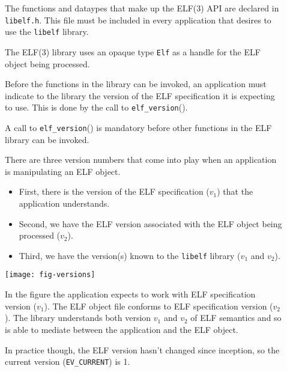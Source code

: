 \documentclass[a4paper]{report}
\makeatletter
\newcommand{\constant}[1]{\texttt{#1}}
\newcommand{\function}[1]{\texttt{#1}()}
\newcommand{\filename}[1]{\texttt{#1}}
\newcommand{\library}[1]{\texttt{#1}}
\newcommand{\type}[1]{\texttt{#1}}
\newenvironment{callout}[2][blue]{%
  \begingroup\newcommand{\@cocolor}{#1}%
  \newcommand{\@cogroup}[1]{#2}}{\endgroup}
\newcommand{\@co}[1]{\framebox{\textbf{\color{\@cocolor}#1}}}
\newcommand{\coref}[1]{%
  \hypertarget{\@cogroup.#1.cr}{%
    \hyperlink{\@cogroup.#1.co}{\@co{#1}}}}
\makeatother
\begin{document}
\begin{callout}{prog1}
  

  \begin{description}
  \item[\coref{1}] The functions and dataypes that make up the ELF(3) API
    are declared in \filename{libelf.h}.  This file must be included
    in every application that desires to use the \library{libelf}
    library.

  \item[\coref{2}] The ELF(3) library uses an opaque type \type{Elf} as a
    handle for the ELF object being processed.

  \item[\coref{4}] Before the functions in the library can be invoked, an
    application must indicate to the library the version of the ELF
    specification it is expecting to use.  This is done by the call to
    \function{elf\_version}.

    A call to \function{elf\_version} is mandatory before other
    functions in the ELF library can be invoked.

    There are three version numbers that come into play when an
    application is manipulating an ELF object.

    \begin{itemize}
    \item First, there is the version of the ELF specification ($v_1$)
      that the application understands.
    \item Second, we have the ELF version associated with the ELF
      object being processed ($v_2$).
    \item Third, we have the version(s) known to the \library{libelf}
      library ($v_1$ and $v_2$).
    \end{itemize}

    \label{fig.versions} \texttt{[image: fig-versions]}

    In the figure  the application expects to
    work with ELF specification version ($v_1$). The ELF object file
    conforms to ELF specification version ($v_2$).  The library
    understands both version $v_1$ and $v_2$ of ELF semantics and so
    is able to mediate between the application and the ELF object.

    In practice though, the ELF version hasn't changed since
    inception, so the current version (\constant{EV\_CURRENT}) is 1.


\end{description}
\end{callout}
\end{document}
